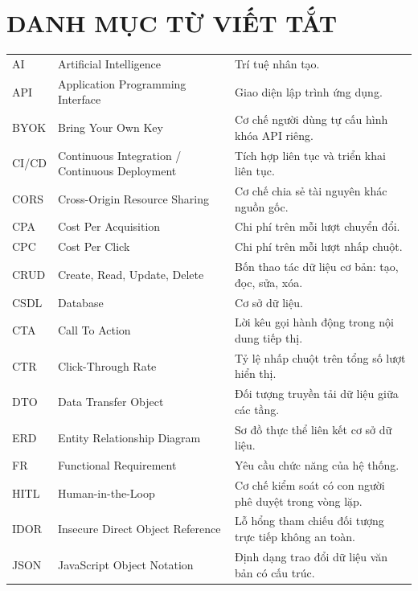 \chapter*{DANH MỤC TỪ VIẾT TẮT}

\begin{spacing}{1.0}
\footnotesize
\renewcommand{\arraystretch}{1.08}
\noindent\begin{tabularx}{\textwidth}{|L{2.3cm}|L{5.4cm}|Y|}
\hline
{} &  & \\
\hline
AI & Artificial Intelligence & Trí tuệ nhân tạo.\\
\hline
API & Application Programming Interface & Giao diện lập trình ứng dụng.\\
\hline
BYOK & Bring Your Own Key & Cơ chế người dùng tự cấu hình khóa API riêng.\\
\hline
CI/CD & Continuous Integration / Continuous Deployment & Tích hợp liên tục và triển khai liên tục.\\
\hline
CORS & Cross-Origin Resource Sharing & Cơ chế chia sẻ tài nguyên khác nguồn gốc.\\
\hline
CPA & Cost Per Acquisition & Chi phí trên mỗi lượt chuyển đổi.\\
\hline
CPC & Cost Per Click & Chi phí trên mỗi lượt nhấp chuột.\\
\hline
CRUD & Create, Read, Update, Delete & Bốn thao tác dữ liệu cơ bản: tạo, đọc, sửa, xóa.\\
\hline
CSDL & Database & Cơ sở dữ liệu.\\
\hline
CTA & Call To Action & Lời kêu gọi hành động trong nội dung tiếp thị.\\
\hline
CTR & Click-Through Rate & Tỷ lệ nhấp chuột trên tổng số lượt hiển thị.\\
\hline
DTO & Data Transfer Object & Đối tượng truyền tải dữ liệu giữa các tầng.\\
\hline
ERD & Entity Relationship Diagram & Sơ đồ thực thể liên kết cơ sở dữ liệu.\\
\hline
FR & Functional Requirement & Yêu cầu chức năng của hệ thống.\\
\hline
HITL & Human-in-the-Loop & Cơ chế kiểm soát có con người phê duyệt trong vòng lặp.\\
\hline
IDOR & Insecure Direct Object Reference & Lỗ hổng tham chiếu đối tượng trực tiếp không an toàn.\\
\hline
JSON & JavaScript Object Notation & Định dạng trao đổi dữ liệu văn bản có cấu trúc.\\

\end{tabularx}
\end{spacing}
